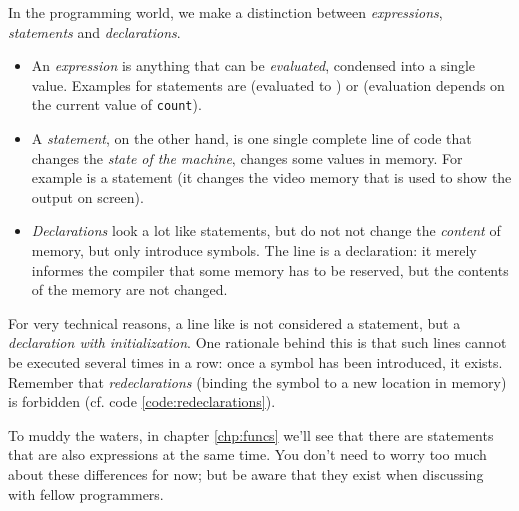 \begin{hintbox}
In the programming world, we make a distinction between \emph{expressions}, \emph{statements} and \emph{declarations}.

\begin{itemize}
\item An \emph{expression} is anything that can be \emph{evaluated}, \ie condensed into a single value. Examples for statements are  (evaluated to ) 
	or  (evaluation depends on the current value of \texttt{count}).
\end{itemize}
\end{hintbox}
%
\begin{hintbox}[]
\begin{itemize}
\item A \emph{statement}, on the other hand, is one single complete line of code that changes the \emph{state of the machine}, \ie changes some values in memory.
	For example  is a statement (it changes the video memory that is used to show the output on screen).
\item \emph{Declarations} look a lot like statements, but do not not change the \emph{content} of memory, but only introduce symbols.
	The line  is a declaration: it merely informes the compiler that some memory has to be reserved, but the contents of the memory are not changed.
\end{itemize}

For very technical reasons, a line like  is not considered a statement, but a \emph{declaration with initialization}. One rationale behind this is that such lines cannot be executed several times in a row: once a symbol has been introduced, it exists. Remember that \emph{redeclarations} (\ie binding the symbol to a new location in memory) is forbidden (cf. code \ref{code:redeclarations}).

To muddy the waters, in chapter \ref{chp:funcs} we'll see that there are statements that are also expressions at the same time. You don't need to worry too much about these differences for now; but be aware that they exist when discussing with fellow programmers.
\end{hintbox}




